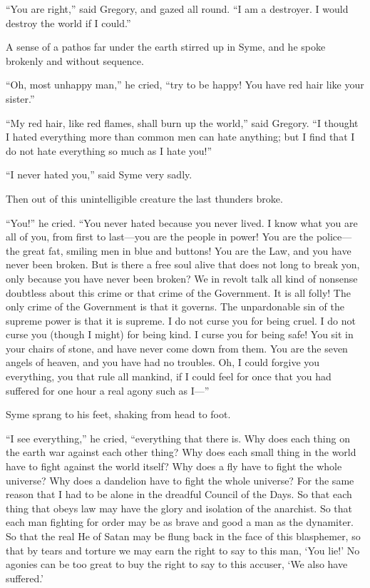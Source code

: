 \documentclass{book}
\begin{document}
“You are right,” said Gregory, and gazed all round. “I am a destroyer. I would destroy the world if I could.”

A sense of a pathos far under the earth stirred up in Syme, and he spoke brokenly and without sequence.

“Oh, most unhappy man,” he cried, “try to be happy! You have red hair like your sister.”

“My red hair, like red flames, shall burn up the world,” said Gregory. “I thought I hated everything more than common men can hate anything; but I find that I do not hate everything so much as I hate you!”

“I never hated you,” said Syme very sadly.

Then out of this unintelligible creature the last thunders broke.

“You!” he cried. “You never hated because you never lived. I know what you are all of you, from first to last—you are the people in power! You are the police—the great fat, smiling men in blue and buttons! You are the Law, and you have never been broken. But is there a free soul alive that does not long to break yon, only because you have never been broken? We in revolt talk all kind of nonsense doubtless about this crime or that crime of the Government. It is all folly! The only crime of the Government is that it governs. The unpardonable sin of the supreme power is that it is supreme. I do not curse you for being cruel. I do not curse you (though I might) for being kind. I curse you for being safe! You sit in your chairs of stone, and have never come down from them. You are the seven angels of heaven, and you have had no troubles. Oh, I could forgive you everything, you that rule all mankind, if I could feel for once that you had suffered for one hour a real agony such as I—”

Syme sprang to his feet, shaking from head to foot.

“I see everything,” he cried, “everything that there is. Why does each thing on the earth war against each other thing? Why does each small thing in the world have to fight against the world itself? Why does a fly have to fight the whole universe? Why does a dandelion have to fight the whole universe? For the same reason that I had to be alone in the dreadful Council of the Days. So that each thing that obeys law may have the glory and isolation of the anarchist. So that each man fighting for order may be as brave and good a man as the dynamiter. So that the real He of Satan may be flung back in the face of this blasphemer, so that by tears and torture we may earn the right to say to this man, ‘You lie!’ No agonies can be too great to buy the right to say to this accuser, ‘We also have suffered.’
\end{document}

